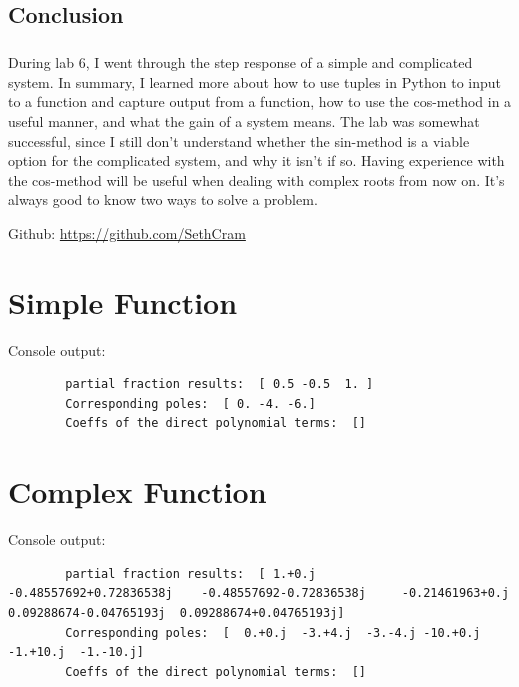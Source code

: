 \documentclass[12pt]{report}
\begin{document}
\section{Conclusion}


    \paragraph{} During lab 6, I went through the step response of a simple and complicated system. In summary, I learned more about how to use tuples in Python to input to a function and capture output from a function, how to use the cos-method in a useful manner, and what the gain of a system means. The lab was somewhat successful, since I still don't understand whether the sin-method is a viable option for the complicated system, and why it isn't if so. Having experience with the cos-method will be useful when dealing with complex roots from now on. It's always good to know two ways to solve a problem.  
    
    Github: \url{https://github.com/SethCram} 
    


\appendix

\chapter{Simple Function}
     Console output:
    \begin{lstlisting}
        partial fraction results:  [ 0.5 -0.5  1. ]
        Corresponding poles:  [ 0. -4. -6.]
        Coeffs of the direct polynomial terms:  []  
    \end{lstlisting}
 
 \chapter{Complex Function}
    Console output:
    \begin{lstlisting}
        partial fraction results:  [ 1.+0.j         -0.48557692+0.72836538j    -0.48557692-0.72836538j     -0.21461963+0.j          0.09288674-0.04765193j  0.09288674+0.04765193j]
        Corresponding poles:  [  0.+0.j  -3.+4.j  -3.-4.j -10.+0.j  -1.+10.j  -1.-10.j]
        Coeffs of the direct polynomial terms:  []        
    \end{lstlisting}

\newpage
\end{document}
